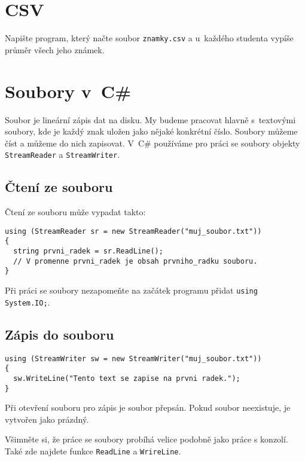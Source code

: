 \documentclass[12pt,a4paper]{article}
\begin{document}
\section{CSV}

Napište program, který načte soubor \texttt{znamky.csv} a u~každého studenta
vypíše průměr všech jeho známek.

\newpage

\section*{Soubory v~C\#}

Soubor je lineární zápis dat na disku. My budeme pracovat hlavně s~textovými
soubory, kde je každý znak uložen jako nějaké konkrétní číslo. Soubory můžeme
číst a můžeme do nich zapisovat. V~C\# používáme pro práci se soubory objekty
\texttt{StreamReader} a \texttt{StreamWriter}.

\subsection*{Čtení ze souboru}

Čtení ze souboru může vypadat takto:

\begin{verbatim}
using (StreamReader sr = new StreamReader("muj_soubor.txt"))
{
  string prvni_radek = sr.ReadLine();
  // V promenne prvni_radek je obsah prvniho_radku souboru.
}
\end{verbatim}

Při práci se soubory nezapomeňte na začátek programu přidat
\texttt{using System.IO;}.

\subsection*{Zápis do souboru}

\begin{verbatim}
using (StreamWriter sw = new StreamWriter("muj_soubor.txt"))
{
  sw.WriteLine("Tento text se zapise na prvni radek.");
}
\end{verbatim}

Při otevření souboru pro zápis je soubor přepsán. Pokud soubor neexistuje, je
vytvořen jako prázdný.

Všimněte si, že práce se soubory probíhá velice podobně jako práce s konzolí.
Také zde najdete funkce \texttt{ReadLine} a \texttt{WrireLine}.
\end{document}
